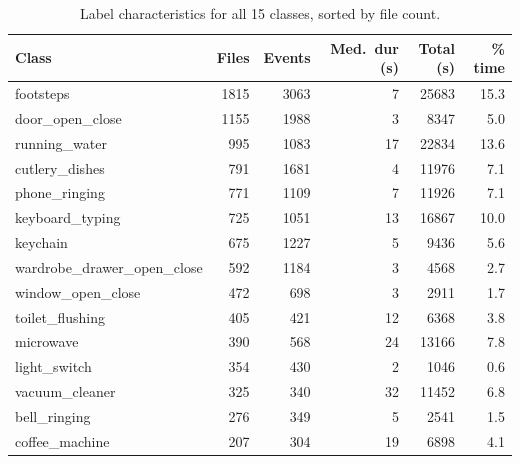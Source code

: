 \documentclass{article}
\begin{document}
\begin{table}[!h]
  \caption{Label characteristics for all 15 classes, sorted by file count.}
  \label{tab:labels}
  \centering
  \small
  \begin{tabular}{lrrrrr}
    \toprule
    Class & Files & Events & Med.\ dur (s) & Total (s) & \% time \\
    \midrule
    footsteps                   & 1815 & 3063 &  7 & 25683 & 15.3 \\
    door\_open\_close           & 1155 & 1988 &  3 &  8347 &  5.0 \\
    running\_water              &  995 & 1083 & 17 & 22834 & 13.6 \\
    cutlery\_dishes             &  791 & 1681 &  4 & 11976 &  7.1 \\
    phone\_ringing              &  771 & 1109 &  7 & 11926 &  7.1 \\
    keyboard\_typing            &  725 & 1051 & 13 & 16867 & 10.0 \\
    keychain                    &  675 & 1227 &  5 &  9436 &  5.6 \\
    wardrobe\_drawer\_open\_close & 592 & 1184 &  3 &  4568 &  2.7 \\
    window\_open\_close         &  472 &  698 &  3 &  2911 &  1.7 \\
    toilet\_flushing            &  405 &  421 & 12 &  6368 &  3.8 \\
    microwave                   &  390 &  568 & 24 & 13166 &  7.8 \\
    light\_switch               &  354 &  430 &  2 &  1046 &  0.6 \\
    vacuum\_cleaner             &  325 &  340 & 32 & 11452 &  6.8 \\
    bell\_ringing               &  276 &  349 &  5 &  2541 &  1.5 \\
    coffee\_machine             &  207 &  304 & 19 &  6898 &  4.1 \\
    \bottomrule
  \end{tabular}
\end{table}
 
\end{document}
